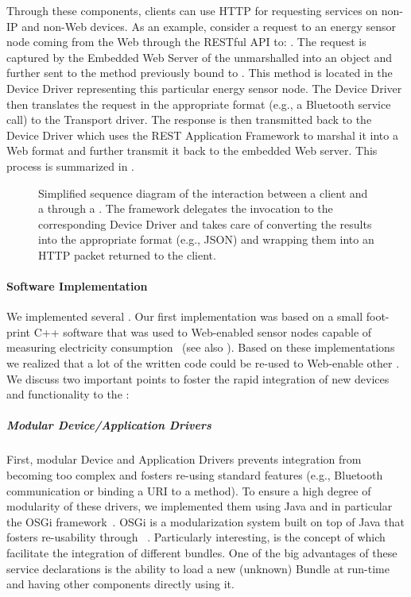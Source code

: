 Through these components, clients can use HTTP for requesting services on non-IP and non-Web devices. As an example, consider a request to an energy sensor node coming from the Web through the RESTful API to:
.
The request is captured by the Embedded Web Server of the \sg{} unmarshalled into an object and further sent to the method previously bound to . This method is located in the Device Driver representing this particular energy sensor node. The Device Driver then translates the request in the appropriate format (e.g., a Bluetooth service call) to the Transport driver. The response is then transmitted back to the Device Driver which uses the REST Application Framework to marshal it into a Web format and further transmit it back to the embedded Web server. This process is summarized in .
\begin{figure}
\caption{Simplified sequence diagram of the interaction between a client and a \st{} through a \sg{}. The \sg{} framework delegates the invocation to the corresponding Device Driver and takes care of converting the results into the appropriate format (e.g., JSON) and wrapping them into an HTTP packet returned to the client.}
\label{fig:gateway-seq}
\end{figure}


\paragraph{Software Implementation}
We implemented several \sgs{}. Our first implementation was based on a small foot-print C++ software that was used to Web-enabled sensor nodes capable of measuring electricity consumption~\cite{Guinard2009} (see also ). Based on these implementations we realized that a lot of the written code could be re-used to Web-enable other \sts{}. We discuss two important points to foster the rapid integration of new devices and functionality to the \sgs{}: 

\subparagraph{Modular Device/Application Drivers}
First, modular Device and Application Drivers prevents \sts{} integration from becoming too complex and fosters re-using standard features (e.g., Bluetooth communication or binding a URI to a method). To ensure a high degree of modularity of these drivers, we implemented them using Java and in particular the OSGi framework~. OSGi is a modularization system built on top of Java that fosters re-usability through ~\cite{Hall2011}. Particularly interesting, is the concept of  which facilitate the integration of different bundles. One of the big advantages of these service declarations is the ability to load a new (unknown) Bundle at run-time and having other components directly using it.

